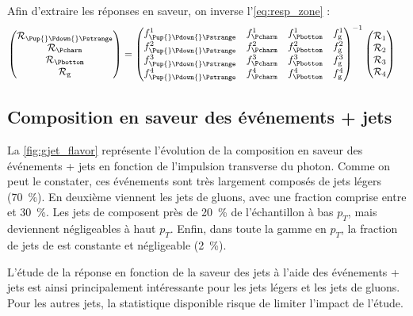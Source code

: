 Afin d'extraire les réponses en saveur, on inverse l'\cref{eq:resp_zone} :
\begin{align} \label{eq:resp_flavor}
  \begin{pmatrix}
    \mathcal{R_\text{\Pup{}\Pdown{}\Pstrange}} \\
    \mathcal{R_{\Pcharm}} \\
    \mathcal{R_{\Pbottom}} \\
    \mathcal{R_\text{g}}
  \end{pmatrix}
  &=
  \begin{pmatrix}
    f^1_{\text{\Pup{}\Pdown{}\Pstrange}} & f^1_{\Pcharm} & f^1_{\Pbottom} & f^1_\text{g} \\
    f^2_{\text{\Pup{}\Pdown{}\Pstrange}} & f^2_{\Pcharm} & f^2_{\Pbottom} & f^2_\text{g} \\
    f^3_{\text{\Pup{}\Pdown{}\Pstrange}} & f^3_{\Pcharm} & f^3_{\Pbottom} & f^3_\text{g} \\
    f^4_{\text{\Pup{}\Pdown{}\Pstrange}} & f^4_{\Pcharm} & f^4_{\Pbottom} & f^4_\text{g}
  \end{pmatrix}^{-1}
  \begin{pmatrix}
    \mathcal{R}_1 \\ \mathcal{R}_2 \\ \mathcal{R}_3 \\ \mathcal{R}_4
  \end{pmatrix}
\end{align}

\subsection{Composition en saveur des événements \texorpdfstring{\Pphoton + jets}{gamma + jets}}

La \cref{fig:gjet_flavor} représente l'évolution de la composition en saveur des événements \Pphoton + jets en fonction de l'impulsion transverse du photon. Comme on peut le constater, ces événements sont très largement composés de jets légers (\tilde\SI{70}{\%}). En deuxième viennent les jets de gluons, avec une fraction comprise entre  et \tilde\SI{30}{\%}. Les jets de \Pcharm composent près de \SI{20}{\%} de l'échantillon à bas $p_T$, mais deviennent négligeables à haut $p_T$. Enfin, dans toute la gamme en $p_T$, la fraction de jets de \Pbottom est constante et négligeable (\tilde\SI{2}{\%}).

\bigskip

L'étude de la réponse en fonction de la saveur des jets à l'aide des événements \Pphoton + jets est ainsi principalement intéressante pour les jets légers et les jets de gluons. Pour les autres jets, la statistique disponible risque de limiter l'impact de l'étude.


